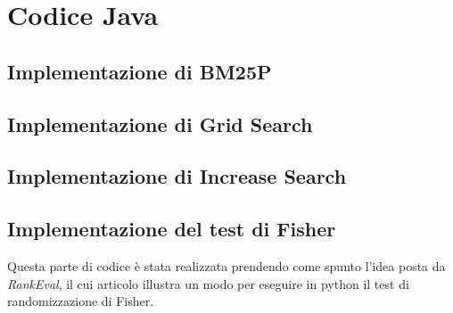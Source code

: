 \chapter{Codice Java}

\section{Implementazione di BM25P}



\section{Implementazione di Grid Search}



\section{Implementazione di Increase Search}



\section{Implementazione del test di Fisher}

Questa parte di codice è stata realizzata prendendo come spunto
l'idea posta da \textit{RankEval}, il cui articolo \cite{rankeval-sigir17} illustra
un modo per eseguire in python il test di randomizzazione
di Fisher.

